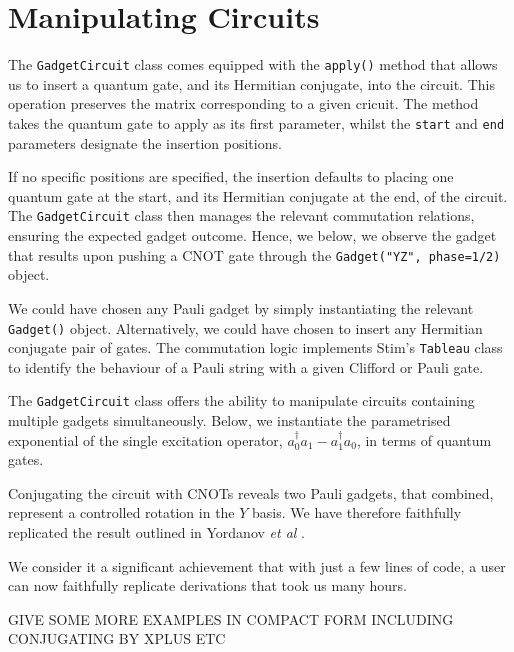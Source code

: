 \section{Manipulating Circuits}%
\label{manipulating-circuits}

The \lstinline{GadgetCircuit} class comes equipped with the \lstinline{apply()} method that allows us to insert a quantum gate, and its Hermitian conjugate, into the circuit. This operation preserves the matrix corresponding to a given cricuit. The method takes the quantum gate to apply as its first parameter, whilst the \lstinline{start} and \lstinline{end} parameters designate the insertion positions.


If no specific positions are specified, the insertion defaults to placing one quantum gate at the start, and its Hermitian conjugate at the end, of the circuit. The \lstinline{GadgetCircuit} class then manages the relevant commutation relations, ensuring the expected gadget outcome. Hence, we below, we observe the gadget that results upon pushing a CNOT gate through the \lstinline{Gadget("YZ", phase=1/2)} object.


We could have chosen any Pauli gadget by simply instantiating the relevant \lstinline{Gadget()} object. Alternatively, we could have chosen to insert any Hermitian conjugate pair of gates. The commutation logic implements Stim's \lstinline{Tableau} class to identify the behaviour of a Pauli string with a given Clifford or Pauli gate.


The \lstinline{GadgetCircuit} class offers the ability to manipulate circuits containing multiple gadgets simultaneously. Below, we instantiate the parametrised exponential of the single excitation operator, $a^\dagger_0 a_1 - a^\dagger_1 a_0$, in terms of quantum gates.


Conjugating the circuit with CNOTs reveals two Pauli gadgets, that combined, represent a controlled rotation in the $Y$ basis. We have therefore faithfully replicated the result outlined in Yordanov \textit{et al} \cite{Yordanov2020}.


We consider it a significant achievement that with just a few lines of code, a user can now faithfully replicate derivations that took us many hours.

GIVE SOME MORE EXAMPLES IN COMPACT FORM INCLUDING CONJUGATING BY XPLUS ETC

